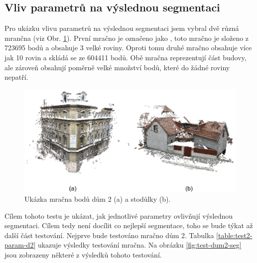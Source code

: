 \documentclass[11pt,twoside,a4paper]{book}
\begin{document}
\subsection{Vliv parametrů na výslednou segmentaci}
\label{sub:vliv-param}

Pro ukázku vlivu parametrů na výslednou segmentaci jsem vybral dvě různá mrančna (viz Obr. \ref{fig:dum-stodulky}). První mračno je označeno jako , toto mračno je složeno z 723695 bodů a obsahuje 3 velké roviny. Oproti tomu druhé mračno  obsahuje více jak 10 rovin a skládá se ze 604411 bodů. Obě mračna reprezentují část budovy, ale zároveň obsahují poměrně velké množství bodů, které do žádné roviny nepatří.

\begin{figure}[H]
\begin{center}
\includegraphics[width=\textwidth]{figures/dum2-stodulky}
\caption{Ukázka mračna bodů dům 2 (a) a stodůlky (b).}
\label{fig:dum-stodulky}
\end{center}
\end{figure}

Cílem tohoto testu je ukázat, jak jednotlivé parametry ovlivňují výslednou segmentaci. Cílem tedy není docílit co nejlepší segmentace, toho se bude týkat až další část testování. Nejprve bude testováno mračno dům 2. Tabulka \ref{table:test2-param-d2} ukazuje výsledky testování mračna. Na obrázku \ref{fig:test-dum2-seg} jsou zobrazeny některé z výsledků tohoto testování.
\end{document}
